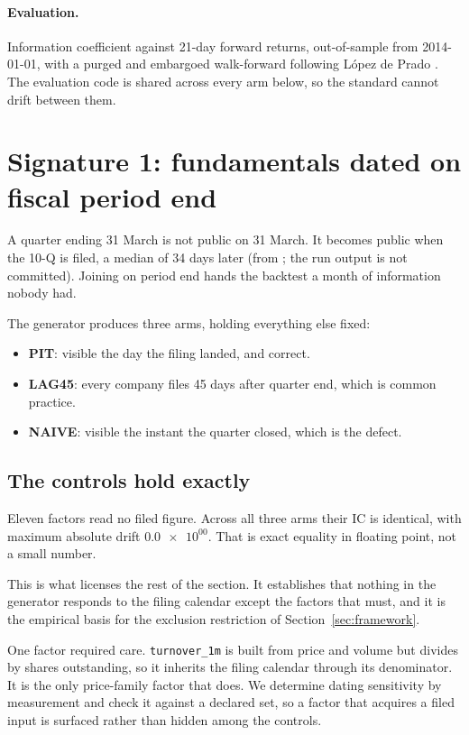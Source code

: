 \documentclass[11pt]{article}
\newcommand{\fac}[1]{\texttt{\small #1}}
\begin{document}
\paragraph{Evaluation.} Information coefficient against 21-day forward returns,
out-of-sample from 2014-01-01, with a purged and embargoed walk-forward following
L\'opez de Prado \cite{lopezdeprado2018}. The evaluation
code is shared across every arm below, so the standard cannot drift between them.

\section{Signature 1: fundamentals dated on fiscal period end}
\label{sec:dating}

A quarter ending 31 March is not public on 31 March. It becomes public when the 10-Q is
filed, a median of 34 days later (from ; the run output is not committed). Joining on period end hands the backtest a month of
information nobody had.

The generator produces three arms, holding everything else fixed:

\begin{itemize}
\item \textbf{PIT}: visible the day the filing landed, and correct.
\item \textbf{LAG45}: every company files 45 days after quarter end, which is common
practice.
\item \textbf{NAIVE}: visible the instant the quarter closed, which is the defect.
\end{itemize}

\subsection{The controls hold exactly}

Eleven factors read no filed figure. Across all three arms their IC is identical, with
maximum absolute drift $\num{0.0e+00}$. That is exact equality in floating point, not a
small number.

This is what licenses the rest of the section. It establishes that nothing in the
generator responds to the filing calendar except the factors that must, and it is the
empirical basis for the exclusion restriction of Section~\ref{sec:framework}.

One factor required care. \fac{turnover\_1m} is built from price and volume but divides
by shares outstanding, so it inherits the filing calendar through its denominator. It is
the only price-family factor that does. We determine dating sensitivity by measurement
and check it against a declared set, so a factor that acquires a filed input is
surfaced rather than hidden among the controls.
\end{document}
